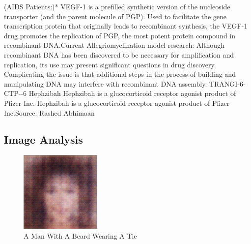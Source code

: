 \documentclass{article}%
\begin{document}
(AIDS Patients:)*\newline%
VEGF{-}1 is a prefilled synthetic version of the nucleoside transporter (and the parent molecule of PGP). Used to facilitate the gene transcription protein that originally leads to recombinant synthesis, the VEGF{-}1 drug promotes the replication of PGP, the most potent protein compound in recombinant DNA.Current Allegriomyelination model research:\newline%
Although recombinant DNA has been discovered to be necessary for amplification and replication, its use may present significant questions in drug discovery. Complicating the issue is that additional steps in the process of building and manipulating DNA may interfere with recombinant DNA assembly.\newline%
TRANGI{-}6{-}CTP{-}{-}6\newline%
Hephzibah\newline%
Hephzibah is a glucocorticoid receptor agonist product of Pfizer Inc.\newline%
Hephzibah is a glucocorticoid receptor agonist product of Pfizer Inc.Source: Rashed Abhimaan

%
\subsection{Image Analysis}%
\label{subsec:ImageAnalysis}%


\begin{figure}[h!]%
\centering%
\includegraphics[width=150px]{500_fake_images/samples_5_143.png}%
\caption{A Man With A Beard Wearing A Tie}%
\end{figure}

%
\end{document}
